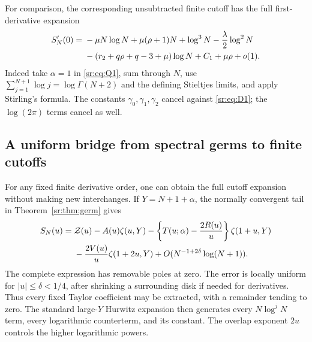 For comparison, the corresponding unsubtracted finite cutoff has
the full first-derivative expansion
\begin{align}
 S_N'(0)={}&-\mu N\log N+\mu(\rho+1)N+\log^3N
 -\frac\lambda2\log^2N\notag\\
 &-(r_2+q\rho+q-3+\mu)\log N+C_1+\mu\rho+o(1).
 \label{sr:eq:cutoff-derivative}
\end{align}
Indeed take $\alpha=1$ in \eqref{sr:eq:Q1}, sum through $N$,
use $\sum_{j=1}^{N+1}\log j=\log\Gamma(N+2)$ and the defining
Stieltjes limits, and apply Stirling's formula. The constants
$\gamma_0,\gamma_1,\gamma_2$ cancel against \eqref{sr:eq:D1}; the
$\log(2\pi)$ terms cancel as well.

\subsection{A uniform bridge from spectral germs to finite cutoffs}
For any fixed finite derivative order, one can obtain the full cutoff
expansion without making new interchanges. If $Y=N+1+\alpha$, the
normally convergent tail in Theorem~\ref{sr:thm:germ} gives
\begin{align}
 S_N(u)={}&\mathcal Z(u)-A(u)\zeta(u,Y)
 -\left\{T(u;\alpha)-\frac{2R(u)}u\right\}\zeta(1+u,Y)\notag\\
 &-\frac{2V(u)}u\zeta(1+2u,Y)
 +O(N^{-1+2\delta}\log(N+1)).
 \label{sr:eq:uniform-cutoff}
\end{align}
The complete expression has removable poles at zero. The error is
locally uniform for $|u|\le\delta<1/4$, after shrinking a surrounding
disk if needed for derivatives. Thus every fixed Taylor coefficient
may be extracted, with a remainder tending to zero. The standard
large-$Y$ Hurwitz expansion then generates every $N\log^jN$ term,
every logarithmic counterterm, and its constant. The overlap exponent
$2u$ controls the higher logarithmic powers.

